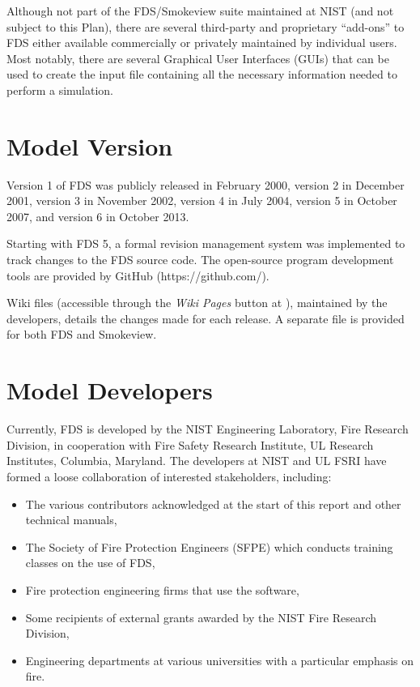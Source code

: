 \documentclass[11pt]{book}
\begin{document}
Although not part of the FDS/Smokeview suite maintained at NIST (and not subject to this Plan), there are several third-party and proprietary ``add-ons'' to FDS either available
commercially or privately maintained by individual users. Most notably, there are several Graphical User Interfaces (GUIs) that can be used to create
the input file containing all the necessary information needed to perform a simulation.



\section{Model Version}

Version 1 of FDS was publicly released in February 2000, version 2 in December 2001, version 3 in November 2002, version 4 in July 2004, version 5 in October 2007, and version 6 in October 2013.

Starting with FDS 5, a formal revision management system was implemented to track changes to the FDS source code. The open-source program development tools are provided by GitHub (https://github.com/).

Wiki files (accessible through the \emph{Wiki Pages} button at \href{https://pages.nist.gov/fds/} {}), maintained by the developers, details the changes made for each release. A separate file is provided for both FDS and Smokeview.


\section{Model Developers}


Currently, FDS is developed by the NIST Engineering Laboratory, Fire Research Division, in cooperation with Fire Safety Research Institute, UL Research Institutes, Columbia, Maryland. The developers at NIST and UL FSRI have formed a loose collaboration of interested stakeholders, including:
\begin{itemize}
\item The various contributors acknowledged at the start of this report and other technical manuals,
\item The Society of Fire Protection Engineers (SFPE) which conducts training classes on the use of FDS,
\item Fire protection engineering firms that use the software,
\item Some recipients of external grants awarded by the NIST Fire Research Division,
\item Engineering departments at various universities with a particular emphasis on fire.
\end{itemize}
\end{document}
